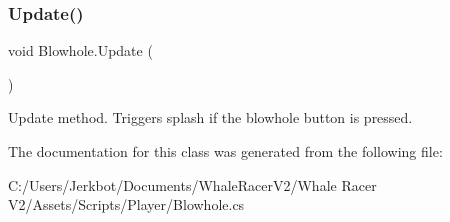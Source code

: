 \subsubsection{\texorpdfstring{Update()}{Update()}}
{\footnotesize\ttfamily void Blowhole.\+Update (\begin{DoxyParamCaption}{ }\end{DoxyParamCaption})\hspace{0.3cm}{\ttfamily [private]}}



Update method. Triggers splash if the blowhole button is pressed. 



The documentation for this class was generated from the following file\+:\begin{DoxyCompactItemize}
\item 
C\+:/\+Users/\+Jerkbot/\+Documents/\+Whale\+Racer\+V2/\+Whale Racer V2/\+Assets/\+Scripts/\+Player/Blowhole.\+cs\end{DoxyCompactItemize}
